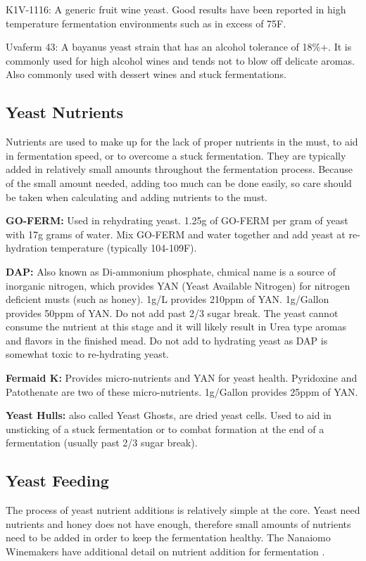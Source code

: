 \documentclass{article}
\begin{document}
  K1V-1116: A generic fruit wine yeast. Good results have been reported in high temperature fermentation environments such as in excess of 75\textdegree F.

  Uvaferm 43: A bayanus yeast strain that has an alcohol tolerance of 18\%+. It is commonly used for high alcohol wines and tends not to blow off 
  delicate aromas. Also commonly used with dessert wines and stuck fermentations. 

 \subsection{Yeast Nutrients}
  Nutrients are used to make up for the lack of proper nutrients in the must, to aid in fermentation speed, or to overcome a stuck fermentation. 
  They are typically added in relatively small amounts throughout the fermentation process. Because of the small amount needed, adding too 
  much can be done easily, so care should be taken when calculating and adding nutrients to the must.

  \textbf{GO-FERM:} Used in rehydrating yeast. 1.25g of GO-FERM per gram of yeast with 17g grams of water. Mix GO-FERM and water together  
  and add yeast at re-hydration temperature (typically 104-109F). 

  \textbf{DAP:} Also known as Di-ammonium phosphate, chmical name  is a source of inorganic nitrogen, which provides YAN 
  (Yeast Available Nitrogen) for nitrogen deficient musts (such as honey). 1g/L provides 210ppm of YAN. 1g/Gallon provides 50ppm of YAN. 
  Do not add past 2/3 sugar break. The yeast cannot consume the nutrient at this stage and it will likely result in Urea type aromas and 
  flavors in the finished mead. Do not add to hydrating yeast as DAP is somewhat toxic to re-hydrating yeast.

  \textbf{Fermaid K:} Provides micro-nutrients and YAN for yeast health. Pyridoxine and Patothenate are two of these micro-nutrients. 
  1g/Gallon provides 25ppm of YAN.

  \textbf{Yeast Hulls:} also called Yeast Ghosts, are dried yeast cells. Used to aid in unsticking of a stuck fermentation or to combat 
   formation at the end of a fermentation (usually past 2/3 sugar break).
  
 \subsection{Yeast Feeding}
  The process of yeast nutrient additions is relatively simple at the core. Yeast need nutrients and honey does not have enough, therefore small amounts
  of nutrients need to be added in order to keep the fermentation healthy. The Nanaiomo Winemakers have additional detail on nutrient addition for fermentation
  \cite{nanaiomo-fermentation}. 
\end{document}
